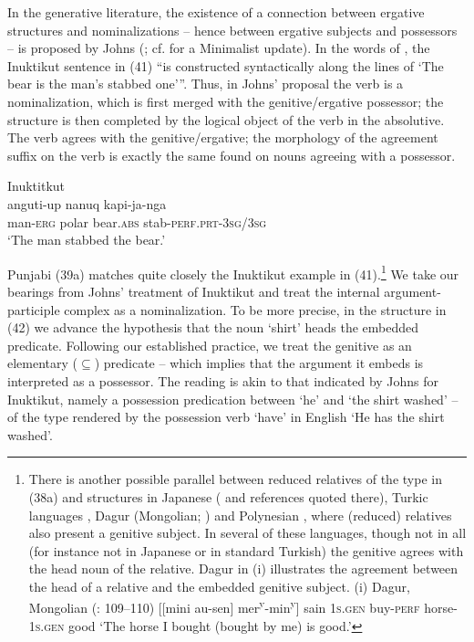 \documentclass[output=paper]{langsci/langscibook}
\begin{document}
In the generative literature, the existence of a connection between ergative structures and nominalizations – hence between ergative subjects and possessors – is proposed by Johns (\citeyear{Johns1992}; cf. \citealt{Yuan2013} for a Minimalist update). In the words of \citet[61]{Johns1992}, the Inuktikut sentence in (41) “is constructed syntactically along the lines of ‘The bear is the man’s stabbed one’”. Thus, in Johns’ proposal the verb is a nominalization, which is first merged with the genitive\slash ergative possessor; the structure is then completed by the logical object of the verb in the absolutive. The verb agrees with the genitive\slash ergative; the morphology of the agreement suffix on the verb is exactly the same found on nouns agreeing with a possessor.

\ea%
         Inuktitkut \citep[61]{Johns1992}\label{ex:manzini:41}\\
    \gll anguti-up   nanuq     kapi-ja-nga\\
         man-\textsc{erg}   {polar bear.\textsc{abs}}  stab-\textsc{perf.prt-3sg/3sg}\\
    \glt ‘The man stabbed the bear.’
\z

Punjabi (39a) matches quite closely the Inuktikut example in (41).\footnote{There is another possible parallel between reduced relatives of the type in (38a) and structures in Japanese (\citealt{Miyagawa2011} and references quoted there), Turkic languages \citep{Kornfilt2008}, Dagur (Mongolian; \citealt{Hale2002}) and Polynesian \citep{Herd2011}, where (reduced) relatives also present a genitive subject. In several of these languages, though not in all (for instance not in Japanese or in standard Turkish) the genitive agrees with the head noun of the relative. Dagur in (i) illustrates the agreement between the head of a relative and the embedded genitive subject. (i)  Dagur, Mongolian (\citealt{Hale2002}: 109–110)   [[mini   au-sen]    mer\textsuperscript{y}{}-min\textsuperscript{y}]   sain  \textsc{1s.gen}  buy-\textsc{perf}  horse-\textsc{1s.gen}  good  ‘The horse I bought (bought by me) is good.’ }  We take our bearings from Johns’ treatment of Inuktikut and treat the internal argument-participle complex as a nominalization. To be more precise, in the structure in (42) we advance the hypothesis that the noun ‘shirt’ heads the embedded predicate. Following our established practice, we treat the genitive as an elementary ($\subseteq$) predicate – which implies that the argument it embeds is interpreted as a possessor. The reading is akin to that indicated by Johns for Inuktikut, namely a possession predication between ‘he’ and ‘the shirt washed’ – of the type rendered by the possession verb ‘have’ in English ‘He has the shirt washed’.  
\end{document}
